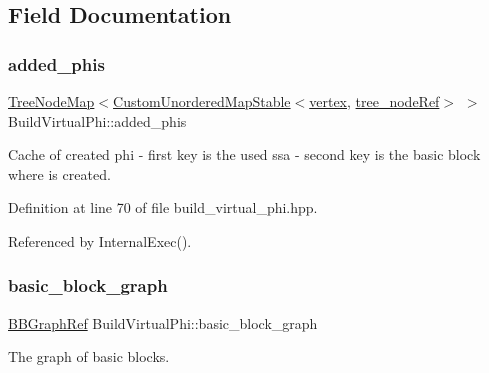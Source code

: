 \subsection{Field Documentation}
\mbox{\label{classBuildVirtualPhi_a1c790417deb37613e44b658809602818}} 
\subsubsection{\texorpdfstring{added\+\_\+phis}{added\_phis}}
{\footnotesize\ttfamily \hyperlink{classTreeNodeMap}{Tree\+Node\+Map}$<$\hyperlink{custom__map_8hpp_a7314a7df1cdb3a3acf478ab86e95c226}{Custom\+Unordered\+Map\+Stable}$<$\hyperlink{graph_8hpp_abefdcf0544e601805af44eca032cca14}{vertex}, \hyperlink{tree__node_8hpp_a6ee377554d1c4871ad66a337eaa67fd5}{tree\+\_\+node\+Ref}$>$ $>$ Build\+Virtual\+Phi\+::added\+\_\+phis\hspace{0.3cm}{\ttfamily [private]}}



Cache of created phi -\/ first key is the used ssa -\/ second key is the basic block where is created. 



Definition at line 70 of file build\+\_\+virtual\+\_\+phi.\+hpp.



Referenced by Internal\+Exec().

\mbox{\label{classBuildVirtualPhi_a714a29c4aa71ff5ed58088ddc116a94a}} 
\subsubsection{\texorpdfstring{basic\+\_\+block\+\_\+graph}{basic\_block\_graph}}
{\footnotesize\ttfamily \hyperlink{basic__block_8hpp_a0e7f233d1b83cad0bfd5aa865f0d3532}{B\+B\+Graph\+Ref} Build\+Virtual\+Phi\+::basic\+\_\+block\+\_\+graph\hspace{0.3cm}{\ttfamily [private]}}



The graph of basic blocks. 



